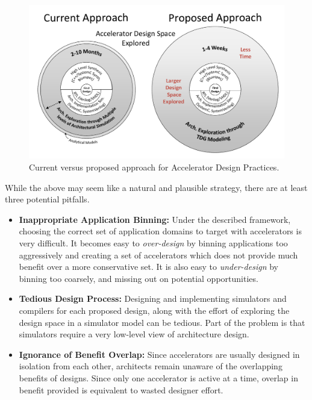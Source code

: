 \begin{figure}
  \begin{center}
    \includegraphics[width=0.8\linewidth]{figs/design-overview.pdf}
  \end{center}
\vspace{-0.2in}
  \caption{Current versus proposed approach for Accelerator Design Practices.}
  \label{fig:design-overview}
\vspace{-0.05in}
\end{figure}

While the above may seem like a natural and plausible strategy, there are
at least three potential pitfalls.

\begin{itemize} 

\item \textbf{Inappropriate Application Binning:} Under the described framework, choosing
the correct set of application domains to target with accelerators is very
difficult.  It becomes easy to \emph{over-design} by binning applications too
aggressively and creating a set of accelerators which does not provide much
benefit over a more conservative set.  It is also easy to \emph{under-design} by
binning too coarsely, and missing out on potential opportunities. 

\item \textbf{Tedious Design Process:}  Designing and implementing
simulators and compilers for each proposed design, along with the
effort of exploring the design space in a simulator model can be tedious.  Part of
the problem is that simulators require a very low-level view of architecture
design.  

\item \textbf{Ignorance of Benefit Overlap:}  Since accelerators are usually designed
in isolation from each other, architects remain unaware of the overlapping benefits
of designs.  Since only one accelerator is active at a time, overlap in benefit
provided is equivalent to wasted designer effort.

\end{itemize}

